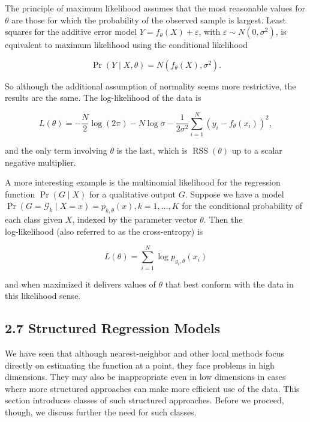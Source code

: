 \documentclass[10pt]{article}
\begin{document}
The principle of maximum likelihood assumes that the most reasonable values for $\theta$ are those for which the probability of the observed sample is largest. Least squares for the additive error model $Y=f_{\theta}(X)+\varepsilon$, with $\varepsilon \sim N\left(0, \sigma^{2}\right)$, is equivalent to maximum likelihood using the conditional likelihood


\begin{equation*}
\operatorname{Pr}(Y \mid X, \theta)=N\left(f_{\theta}(X), \sigma^{2}\right) . \tag{2.34}
\end{equation*}


So although the additional assumption of normality seems more restrictive, the results are the same. The log-likelihood of the data is


\begin{equation*}
L(\theta)=-\frac{N}{2} \log (2 \pi)-N \log \sigma-\frac{1}{2 \sigma^{2}} \sum_{i=1}^{N}\left(y_{i}-f_{\theta}\left(x_{i}\right)\right)^{2}, \tag{2.35}
\end{equation*}


and the only term involving $\theta$ is the last, which is $\operatorname{RSS}(\theta)$ up to a scalar negative multiplier.

A more interesting example is the multinomial likelihood for the regression function $\operatorname{Pr}(G \mid X)$ for a qualitative output $G$. Suppose we have a model $\operatorname{Pr}\left(G=\mathcal{G}_{k} \mid X=x\right)=p_{k, \theta}(x), k=1, \ldots, K$ for the conditional probability of each class given $X$, indexed by the parameter vector $\theta$. Then the\\
log-likelihood (also referred to as the cross-entropy) is


\begin{equation*}
L(\theta)=\sum_{i=1}^{N} \log p_{g_{i}, \theta}\left(x_{i}\right) \tag{2.36}
\end{equation*}


and when maximized it delivers values of $\theta$ that best conform with the data in this likelihood sense.

\subsection*{2.7 Structured Regression Models}
We have seen that although nearest-neighbor and other local methods focus directly on estimating the function at a point, they face problems in high dimensions. They may also be inappropriate even in low dimensions in cases where more structured approaches can make more efficient use of the data. This section introduces classes of such structured approaches. Before we proceed, though, we discuss further the need for such classes.
\end{document}
